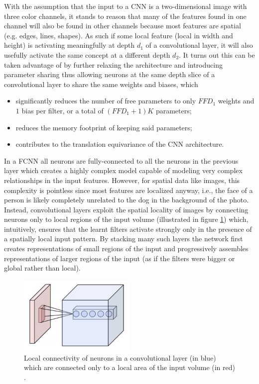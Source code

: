 With the assumption that the input to a \ac{CNN} is a two-dimensional image with three color channels, it stands to reason that many of the features found in one channel will also be found in other channels because most features are spatial (e.g. edges, lines, shapes). As such if some local feature (local in width and height) is activating meaningfully at depth $d_1$ of a convolutional layer, it will also usefully activate the same concept at a different depth $d_2$. It turns out this can be taken advantage of by further relaxing the architecture and introducing parameter sharing thus allowing neurons at the same depth slice of a convolutional layer to share the same weights and biases, which

\begin{itemize}
    \item significantly reduces the number of free parameters to only $F F D_1$ weights and $1$ bias per filter, or a total of $(F F D_1 + 1) K$ parameters;
    \item reduces the memory footprint of keeping said parameters;
    \item contributes to the translation equivariance of the \ac{CNN} architecture.
\end{itemize}

In a \ac{FCNN} all neurons are fully-connected to all the neurons in the previous layer which creates a highly complex model capable of modeling very complex relationships in the input features. However, for spatial data like images, this complexity is pointless since most features are localized anyway, i.e., the face of a person is likely completely unrelated to the dog in the background of the photo. Instead, convolutional layers exploit the spatial locality of images by connecting neurons only to local regions of the input volume (illustrated in figure \ref{fig:localconnectivity}) which, intuitively, ensures that the learnt filters activate strongly only in the presence of a spatially local input pattern. By stacking many such layers the network first creates representations of small regions of the input and progressively assembles representations of larger regions of the input (as if the filters were bigger or global rather than local).

\begin{figure}[ht]
    \centering
    \includegraphics[width=0.5\textwidth]{figs/localconnectivity.png}
    \caption{Local connectivity of neurons in a convolutional layer (in blue) which are connected only to a local area of the input volume (in red) \cite{cs231n}.}
    \label{fig:localconnectivity}
\end{figure}

